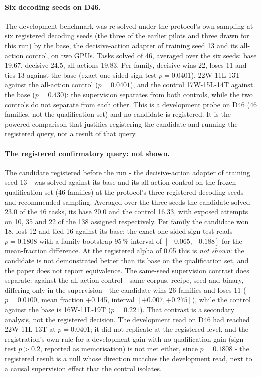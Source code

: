 \paragraph{Six decoding seeds on D46.} The development benchmark was re-solved under the protocol's own sampling at six registered decoding seeds (the three of the earlier pilots and three drawn for this run) by the base, the decisive-action adapter of training seed 13 and its all-action control, on two GPUs. Tasks solved of 46, averaged over the six seeds: base 19.67, decisive 24.5, all-actions 19.83. Per family, decisive wins 22, loses 11 and ties 13 against the base (exact one-sided sign test $p=0.0401$), 22W-11L-13T against the all-action control ($p=0.0401$), and the control 17W-15L-14T against the base ($p=0.430$): the supervision separates from both controls, while the two controls do not separate from each other. This is a development probe on D46 (46 families, not the qualification set) and no candidate is registered. It is the powered comparison that justifies registering the candidate and running the registered query, not a result of that query.

\paragraph{The registered confirmatory query: not shown.} The candidate registered before the run - the decisive-action adapter of training seed 13 - was solved against its base and its all-action control on the frozen qualification set (46 families) at the protocol's three registered decoding seeds and recommended sampling. Averaged over the three seeds the candidate solved 23.0 of the 46 tasks, its base 20.0 and the control 16.33, with exposed attempts on 10, 35 and 22 of the 138 assigned respectively. Per family the candidate won 18, lost 12 and tied 16 against its base: the exact one-sided sign test reads $p=0.1808$ with a family-bootstrap 95\,\% interval of $[-0.065, +0.188]$ for the mean-fraction difference. At the registered alpha of 0.05 this is \emph{not shown}: the candidate is not demonstrated better than its base on the qualification set, and the paper does not report equivalence. The same-seed supervision contrast does separate: against the all-action control - same corpus, recipe, seed and binary, differing only in the supervision - the candidate wins 26 families and loses 11 ($p=0.0100$, mean fraction +0.145, interval $[+0.007, +0.275]$), while the control against the base is 16W-11L-19T ($p=0.221$). That contrast is a secondary analysis, not the registered decision. The development read on D46 had reached 22W-11L-13T at $p=0.0401$; it did not replicate at the registered level, and the registration's own rule for a development gain with no qualification gain (sign test $p>0.2$, reported as memorisation) is not met either, since $p=0.1808$ - the registered result is a null whose direction matches the development read, next to a causal supervision effect that the control isolates.

